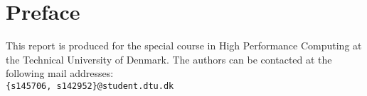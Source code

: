 \chapter{Preface}

This report is produced for the special course in High Performance Computing at the Technical University of Denmark.
The authors can be contacted at the following mail addresses:\\
\small\texttt{\{s145706, s142952\}@student.dtu.dk}

\vfill

{
\begin{flushright}
    \thesisauthor{}
\end{flushright}
}

